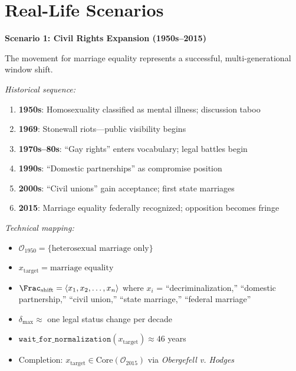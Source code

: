 \section{Real-Life Scenarios}
\label{sec:overton-scenarios}

\begin{tcolorbox}[colback=yellow!5!white,colframe=yellow!65!black,title=\textbf{Real-Life Scenarios: Overton Window Shifts},breakable]

\textbf{Scenario 1: Civil Rights Expansion (1950s--2015)}

The movement for marriage equality represents a successful, multi-generational
window shift.

\textit{Historical sequence:}
\begin{enumerate}
    \item \textbf{1950s}: Homosexuality classified as mental illness; discussion taboo
    \item \textbf{1969}: Stonewall riots---public visibility begins
    \item \textbf{1970s--80s}: ``Gay rights'' enters vocabulary; legal battles begin
    \item \textbf{1990s}: ``Domestic partnerships'' as compromise position
    \item \textbf{2000s}: ``Civil unions'' gain acceptance; first state marriages
    \item \textbf{2015}: Marriage equality federally recognized; opposition becomes fringe
\end{enumerate}

\textit{Technical mapping:}
\begin{itemize}
    \item $\mathcal{O}_{1950} = \{\text{heterosexual marriage only}\}$
    \item $x_{\mathrm{target}} = \text{marriage equality}$
    \item $\Frac_{\mathrm{shift}} = \langle x_1, x_2, \ldots, x_n \rangle$ where
          $x_i$ = ``decriminalization,'' ``domestic partnership,'' ``civil union,''
          ``state marriage,'' ``federal marriage''
    \item $\delta_{\max} \approx$ one legal status change per decade
    \item $\mathtt{wait\_for\_normalization}(x_{\mathrm{target}}) \approx 46$ years
    \item Completion: $x_{\mathrm{target}} \in \mathrm{Core}(\mathcal{O}_{2015})$ via
          \textit{Obergefell v. Hodges}
\end{itemize}


\end{tcolorbox}
